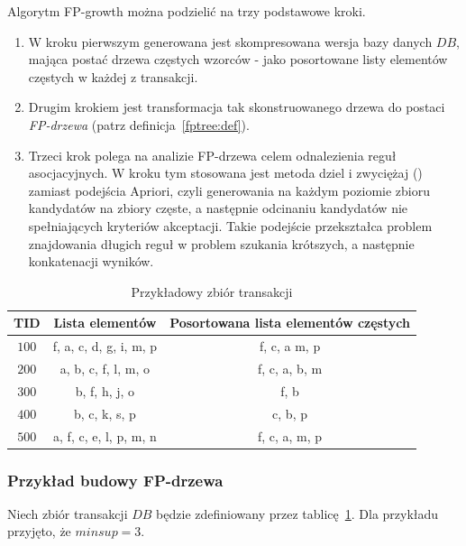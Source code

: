 Algorytm FP-growth można podzielić na trzy podstawowe kroki.
\begin{enumerate}
	\item W kroku pierwszym generowana jest skompresowana wersja bazy danych $DB$, mająca postać drzewa częstych wzorców - jako posortowane listy elementów częstych w każdej z transakcji.
	\item Drugim krokiem jest transformacja tak skonstruowanego drzewa do postaci \emph{FP-drzewa} (patrz definicja~\ref{fptree:def}).
	\item Trzeci krok polega na analizie FP-drzewa celem odnalezienia reguł asocjacyjnych. W kroku tym stosowana jest metoda dziel i zwyciężaj () zamiast podejścia Apriori, czyli generowania na każdym poziomie zbioru kandydatów na zbiory częste, a następnie odcinaniu kandydatów nie spełniających kryteriów akceptacji. Takie podejście przekształca problem znajdowania długich reguł w problem szukania krótszych, a następnie konkatenacji wyników. 
\end{enumerate}

\begin{table}
	\centering
	\begin{tabular}{|c|c|c|} \hline
	\textbf{TID} &  \textbf{Lista elementów} & \textbf{Posortowana lista elementów częstych} \\ \hline
	$100$ & f, a, c, d, g, i, m, p & f, c, a m, p \\ 
	$200$ & a, b, c, f, l, m, o & f, c, a, b, m \\ 
	$300$ & b, f, h, j, o & f, b \\
	$400$ & b, c, k, s, p & c, b, p \\
	$500$ & a, f, c, e, l, p, m, n & f, c, a, m, p \\ \hline
	\end{tabular}
	\caption{Przykładowy zbiór transakcji\label{example:fp_data}}
\end{table}

\subsubsection{Przykład budowy FP-drzewa}\label{sec:example_fptree}
Niech zbiór transakcji $DB$ będzie zdefiniowany przez tablicę~\ref{example:fp_data}. Dla przykładu przyjęto, że $minsup = 3$.

